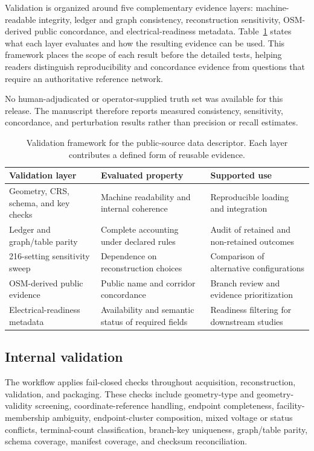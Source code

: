 \documentclass[10pt]{article}
\begin{document}
Validation is organized around five complementary evidence layers: machine-readable integrity, ledger and graph consistency, reconstruction sensitivity, OSM-derived public concordance, and electrical-readiness metadata. Table~\ref{tab:claim-bounded-validation} states what each layer evaluates and how the resulting evidence can be used. This framework places the scope of each result before the detailed tests, helping readers distinguish reproducibility and concordance evidence from questions that require an authoritative reference network.

No human-adjudicated or operator-supplied truth set was available for this release. The manuscript therefore reports measured consistency, sensitivity, concordance, and perturbation results rather than precision or recall estimates.

\begin{table}[!ht]
\centering
\small
\caption{Validation framework for the public-source data descriptor. Each layer contributes a defined form of reusable evidence.}
\label{tab:claim-bounded-validation}
\begin{tabular}{p{}p{}p{}}
\toprule
Validation layer & Evaluated property & Supported use \\
\midrule
Geometry, CRS, schema, and key checks & Machine readability and internal coherence & Reproducible loading and integration \\
Ledger and graph/table parity & Complete accounting under declared rules & Audit of retained and non-retained outcomes \\
216-setting sensitivity sweep & Dependence on reconstruction choices & Comparison of alternative configurations \\
OSM-derived public evidence & Public name and corridor concordance & Branch review and evidence prioritization \\
Electrical-readiness metadata & Availability and semantic status of required fields & Readiness filtering for downstream studies \\
\bottomrule
\end{tabular}
\end{table}
\FloatBarrier

\subsection{Internal validation}

The workflow applies fail-closed checks throughout acquisition, reconstruction, validation, and packaging. These checks include geometry-type and geometry-validity screening, coordinate-reference handling, endpoint completeness, facility-membership ambiguity, endpoint-cluster composition, mixed voltage or status conflicts, terminal-count classification, branch-key uniqueness, graph/table parity, schema coverage, manifest coverage, and checksum reconciliation.
\end{document}
